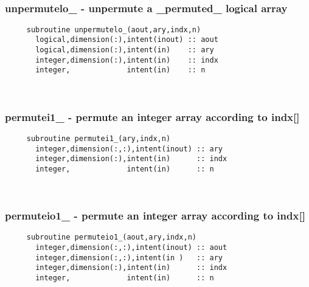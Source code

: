  
\mbox{}\hrulefill\ 
 
  \subsubsection{unpermutelo\_ - unpermute a \_permuted\_ logical array}

\begin{verbatim} 
     subroutine unpermutelo_(aout,ary,indx,n)
       logical,dimension(:),intent(inout) :: aout
       logical,dimension(:),intent(in)    :: ary
       integer,dimension(:),intent(in)    :: indx
       integer,             intent(in)    :: n
 \end{verbatim}%
 
 
\mbox{}\hrulefill\ 
 
  \subsubsection{permutei1\_ - permute an integer array according to indx[]}

\begin{verbatim} 
     subroutine permutei1_(ary,indx,n)
       integer,dimension(:,:),intent(inout) :: ary
       integer,dimension(:),intent(in)      :: indx
       integer,             intent(in)      :: n
 \end{verbatim}%
 
 
\mbox{}\hrulefill\ 
 
  \subsubsection{permuteio1\_ - permute an integer array according to indx[]}

\begin{verbatim} 
     subroutine permuteio1_(aout,ary,indx,n)
       integer,dimension(:,:),intent(inout) :: aout
       integer,dimension(:,:),intent(in )   :: ary
       integer,dimension(:),intent(in)      :: indx
       integer,             intent(in)      :: n
 \end{verbatim}%
 
